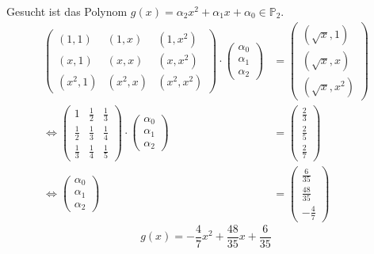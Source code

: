\documentclass[10pt,a4paper]{article}
\begin{document}
Gesucht ist das Polynom $g(x) = \alpha_{2}x^{2} + \alpha_{1}x + \alpha_{0} \in \mathbb{P}_{2}$.
\begin{align*}
  \begin{pmatrix}
    (1, 1) & (1, x) & (1, x^{2})\\
    (x, 1) & (x, x) & (x, x^{2})\\
    (x^{2}, 1) & (x^{2}, x) & (x^{2}, x^{2})
  \end{pmatrix}
  \cdot
  \begin{pmatrix}
    \alpha_{0}\\\alpha_{1}\\\alpha_{2}
  \end{pmatrix}
  & =
  \begin{pmatrix}
    (\sqrt{x}, 1)\\
    (\sqrt{x}, x)\\
    (\sqrt{x}, x^{2})
  \end{pmatrix}
  \\
  \Leftrightarrow
  \begin{pmatrix}
    1 & \frac{1}{2} & \frac{1}{3}\\
    \frac{1}{2} & \frac{1}{3} & \frac{1}{4}\\
    \frac{1}{3} & \frac{1}{4} & \frac{1}{5}
  \end{pmatrix}
  \cdot
  \begin{pmatrix}
    \alpha_{0}\\\alpha_{1}\\\alpha_{2}
  \end{pmatrix}
  & =
  \begin{pmatrix}
    \frac{2}{3}\\
    \frac{2}{5}\\
    \frac{2}{7}
  \end{pmatrix}
  \\
  \Leftrightarrow
  \begin{pmatrix}
    \alpha_{0}\\\alpha_{1}\\\alpha_{2}
  \end{pmatrix}
  & =
  \begin{pmatrix}
    \frac{6}{35}\\
    \frac{48}{35}\\
    -\frac{4}{7}
  \end{pmatrix}
\end{align*}
\begin{equation}
  g(x) = -\frac{4}{7}x^{2} + \frac{48}{35}x + \frac{6}{35}
\end{equation}
\end{document}
